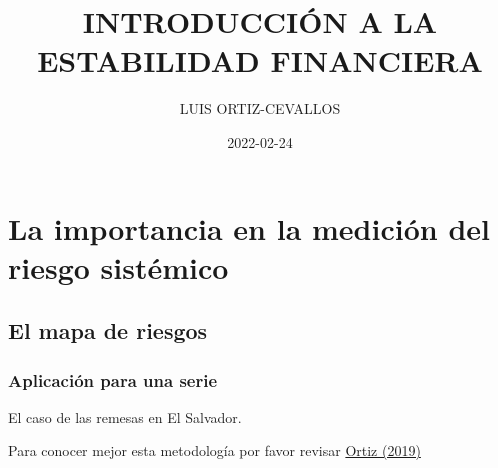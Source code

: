 \documentclass[
]{book}
\title{INTRODUCCIÓN A LA ESTABILIDAD FINANCIERA}
\author{LUIS ORTIZ-CEVALLOS}
\date{2022-02-24}
\begin{document}
\maketitle

{
\setcounter{tocdepth}{1}
\tableofcontents
}
\hypertarget{la-importancia-en-la-mediciuxf3n-del-riesgo-sistuxe9mico}{%
\chapter{La importancia en la medición del riesgo sistémico}\label{la-importancia-en-la-mediciuxf3n-del-riesgo-sistuxe9mico}}

\hypertarget{el-mapa-de-riesgos}{%
\section{El mapa de riesgos}\label{el-mapa-de-riesgos}}

\hypertarget{aplicaciuxf3n-para-una-serie}{%
\subsection{Aplicación para una serie}\label{aplicaciuxf3n-para-una-serie}}

El caso de las remesas en El Salvador.

Para conocer mejor esta metodología por favor revisar
\href{http://www.secmca.org/wp-content/uploads/2019/05/Nota-Econ\%C3\%B3mica-Regional-No.-102.pdf}{Ortiz (2019)}
\end{document}
